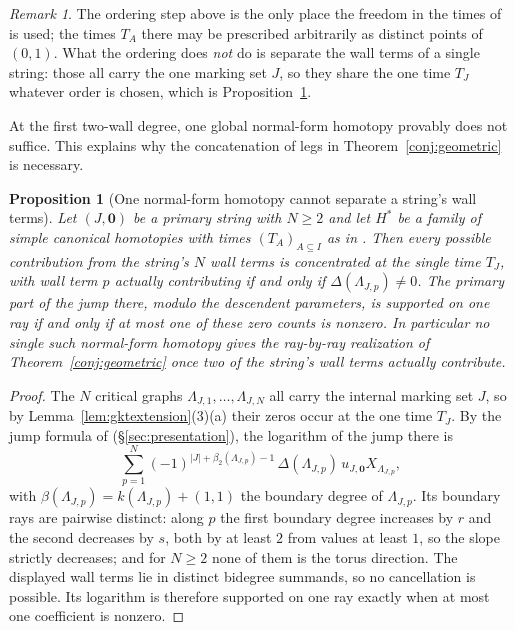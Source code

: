 \documentclass[11pt]{amsart}
\newtheorem{proposition}[theorem]{Proposition}
\theoremstyle{definition}
\theoremstyle{remark}
\newtheorem{remark}[theorem]{Remark}
\begin{document}
\begin{remark}
\label{rem:orderinggap}
The ordering step above is the only place the freedom in the times of
\cite[Lem.~3.40]{GKT} is used; the times $T_A$ there may be prescribed
arbitrarily as distinct points of $(0,1)$. What the ordering does
\emph{not} do is separate the wall terms of a single string: those all carry the one
marking set $J$, so they share the one time $T_{J}$ whatever order is chosen, which
is Proposition~\ref{prop:obstruction}.
\end{remark}

At the first two-wall degree, one global normal-form homotopy provably
does not suffice. This explains why the concatenation of legs in
Theorem~\ref{conj:geometric} is necessary.

\begin{proposition}[One normal-form homotopy cannot separate a string's wall terms]
\label{prop:obstruction}
Let $(J,\mathbf 0)$ be a primary string with $N\ge2$ and let $H^{*}$ be a family
of simple canonical homotopies with times $(T_{A})_{A\subseteq I}$ as in
\cite[Lem.~3.40]{GKT}. Then every possible contribution from the string's
$N$ wall terms is concentrated at the single time $T_{J}$, with wall term $p$
actually contributing if and only if $\Delta(\Lambda_{J,p})\ne0$. The primary part of
the jump there, modulo the descendent parameters, is supported on one ray if
and only if at most one of these zero counts is nonzero.
In particular no single
such normal-form homotopy gives the ray-by-ray realization of
Theorem~\ref{conj:geometric} once two of the string's wall terms actually
contribute.
\end{proposition}

\begin{proof}
The $N$ critical graphs $\Lambda_{J,1},\dots,\Lambda_{J,N}$ all carry the internal
marking set $J$, so by Lemma~\ref{lem:gktextension}(3)(a) their zeros occur at the one
time $T_{J}$. By the jump formula of \cite[proof of Thm.~5.9]{GKT}
(\S\ref{sec:presentation}), the logarithm of the jump there is
\[
\sum_{p=1}^{N}(-1)^{|J|+\beta_{2}(\Lambda_{J,p})-1}\,\Delta(\Lambda_{J,p})\,
u_{J,\mathbf0}X_{\Lambda_{J,p}},
\]
with $\beta(\Lambda_{J,p})=k(\Lambda_{J,p})+(1,1)$ the boundary degree of
$\Lambda_{J,p}$.  Its boundary rays are pairwise distinct: along $p$ the first
boundary degree increases by $r$ and the second decreases by $s$, both by at least
$2$ from values at least $1$, so the slope strictly decreases; and for $N\ge2$ none
of them is the torus direction. The displayed wall terms lie in distinct
bidegree summands, so no cancellation is possible. Its logarithm is therefore
supported on one ray exactly when at most one coefficient is nonzero.
\end{proof}
\end{document}
